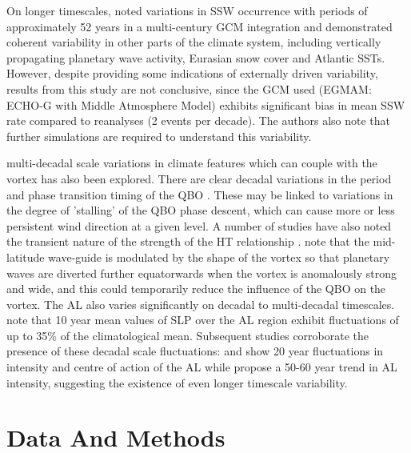 On longer timescales, \cite{Schimanke2011} noted variations in SSW occurrence with periods of approximately 52 years in a multi-century GCM integration and demonstrated coherent variability in other parts of the climate system, including vertically propagating planetary wave activity, Eurasian snow cover and Atlantic SSTs. However, despite providing some indications of externally driven variability, results from this study are not conclusive, since the GCM used (EGMAM: ECHO‐G with Middle Atmosphere Model) exhibits significant bias in mean SSW rate compared to reanalyses (2 events per decade). The authors also note that further simulations are required to understand this variability. 

multi-decadal scale variations in climate features which can couple with the vortex has also been explored. There are clear decadal variations in the period and phase transition timing of the QBO \citep{Pascoe2005,Anstey2008,Yang2016}. These may be linked to variations in the degree of 'stalling' of the QBO phase descent, which can cause more or less persistent wind direction at a given level.  A number of studies have also noted the transient nature of the strength of the HT relationship \citep{Lu2008,Lu14,Anstey2008,OspEA10}. \cite{Lu2008,Lu14} note that the mid-latitude wave-guide is modulated by the shape of the vortex so that planetary waves are diverted further equatorwards when the vortex is anomalously strong and wide, and this could temporarily reduce the influence of the QBO on the vortex. The AL also varies significantly on decadal to multi-decadal timescales. \cite{Overland1999} note that 10 year mean values of SLP over the AL region exhibit fluctuations of up to 35\% of the climatological mean. Subsequent studies corroborate the presence of these decadal scale fluctuations: \cite{SUGIMOTO2009} and \cite{Minobe} show 20 year fluctuations in intensity and centre of action of the AL while \cite{Raible2005} propose a 50-60 year trend in AL intensity, suggesting the existence of even longer timescale variability. 

\section{Data And Methods}
